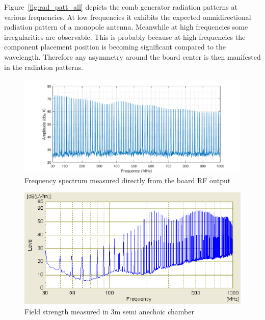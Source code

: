 \documentclass{pj}
\begin{document}
Figure~\ref{fig:rad_patt_all} depicts the comb generator radiation patterns at various frequencies. At low frequencies it exhibits the expected omnidirectional radiation pattern of a monopole antenna. Meanwhile at high frequencies some irregularities are observable. This is probably because at high frequencies the component placement position is becoming significant compared to the wavelength. Therefore any asymmetry around the board center is then manifested in the radiation patterns. 

\begin{figure}[h]
	\centerline{\includegraphics[width=1\columnwidth,draft=false]{comb_re_direct_1.pdf}}
	\caption{Frequency spectrum measured directly from the board RF output}
	\label{fig:comb_re_direct}
\end{figure}

\begin{figure}[h]
	\centerline{\includegraphics[width=0.9\columnwidth,draft=false]{scan_re_small.pdf}}
	\caption{Field strength measured in 3m semi anechoic chamber}
	\label{fig:scan_re_small}
\end{figure}
\end{document}
